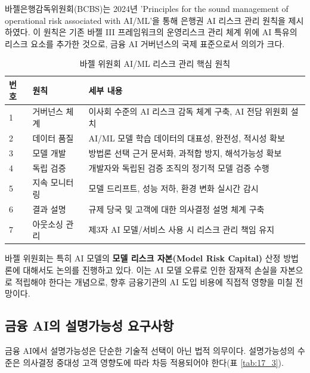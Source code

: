 바젤은행감독위원회(BCBS)는 2024년 'Principles for the sound management of operational risk associated with AI/ML'을 통해 은행권 AI 리스크 관리 원칙을 제시하였다. 이 원칙은 기존 바젤 III 프레임워크의 운영리스크 관리 체계 위에 AI 특유의 리스크 요소를 추가한 것으로, 금융 AI 거버넌스의 국제 표준으로서 의의가 크다.

\begin{table}[htbp]
\centering
\caption{바젤 위원회 AI/ML 리스크 관리 핵심 원칙}
\label{tab:17_basel}
\begin{tabularx}{\textwidth}{p{0.8cm}p{3cm}X}
\toprule
\textbf{번호} & \textbf{원칙} & \textbf{세부 내용} \\
\midrule
1 & 거버넌스 체계 & 이사회 수준의 AI 리스크 감독 체계 구축, AI 전담 위원회 설치 \\
2 & 데이터 품질 & AI/ML 모델 학습 데이터의 대표성, 완전성, 적시성 확보 \\
3 & 모델 개발 & 방법론 선택 근거 문서화, 과적합 방지, 해석가능성 확보 \\
4 & 독립 검증 & 개발자와 독립된 검증 조직의 정기적 모델 검증 수행 \\
5 & 지속 모니터링 & 모델 드리프트, 성능 저하, 환경 변화 실시간 감시 \\
6 & 결과 설명 & 규제 당국 및 고객에 대한 의사결정 설명 체계 구축 \\
7 & 아웃소싱 관리 & 제3자 AI 모델/서비스 사용 시 리스크 관리 책임 유지 \\
\bottomrule
\end{tabularx}
\end{table}

바젤 위원회는 특히 AI 모델의 \textbf{모델 리스크 자본(Model Risk Capital)} 산정 방법론에 대해서도 논의를 진행하고 있다. 이는 AI 모델 오류로 인한 잠재적 손실을 자본으로 적립해야 한다는 개념으로, 향후 금융기관의 AI 도입 비용에 직접적 영향을 미칠 전망이다.

\subsection{금융 AI의 설명가능성 요구사항}
\label{sec:17.1.3}

금융 AI에서 설명가능성은 단순한 기술적 선택이 아닌 법적 의무이다. 설명가능성의 수준은 의사결정 중대성 고객 영향도에 따라 차등 적용되어야 한다(표 \ref{tab:17_3}).

